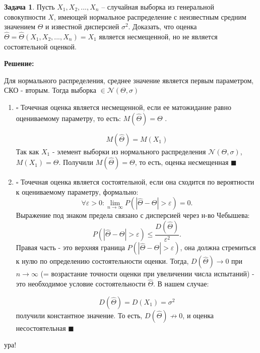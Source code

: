 \documentclass[a4paper,11pt]{article}
\theoremstyle{definition}
\newtheorem{problem}{Задача}\setlength{\parindent}{0pt}
\newenvironment{solution}
{\begin{shaded}\textbf{Решение:}\par\setlength{\parindent}{0pt}}
{\end{shaded}}
\newenvironment{answer}
{\par\noindent\textbf{Ответ:}}
{\par}
\begin{document}
\vspace{8pt}
\begin{problem}
    Пусть \(X_1,X_2, ... ,X_n\) – случайная выборка из генеральной совокупности \(X\), 
    имеющей нормальное распределение с неизвестным средним значением \( \Theta \) 
    и известной дисперсией \( \sigma ^ 2\). Доказать, что оценка 
    \( \hat\Theta = \hat\Theta (X_1,X_2, ... ,X_n) = X_1 \) является несмещенной, 
    но не является состоятельной оценкой.

    \begin{solution}
        Для нормального распределения, среднее значение является первым параметром, СКО - вторым. 
        Тогда выборка \(\in \mathcal{N}(\Theta, \sigma)\)
        \begin{enumerate}
            \item \(\square\) Точечная оценка является несмещенной, если ее матожидание 
                  равно оцениваемому параметру, то есть: \(M(\hat{\Theta}) = \Theta\) .

                  \[ M(\hat{\Theta}) = M(X_1)\]
                  Так как \(X_1\) - элемент выборки из нормального распределения \(\mathcal{N}(\Theta, \sigma)\),
                  \(M(X_1) = \Theta\). Получили \(M(\hat{\Theta}) = \Theta\), то есть, оценка несмещенная \(\blacksquare\)

            \item \(\square\) Точечная оценка является состоятельной, если она сходится по вероятности 
                  к оцениваемому параметру, формально:
                  \[\forall\varepsilon > 0 : \lim_{n\to\infty}P(|\hat{\Theta} - \Theta| > \varepsilon) = 0.\]
                  Выражение под знаком предела связано с дисперсией через н-во Чебышева: 
                  \[ P(|\hat{\Theta} - \Theta| > \varepsilon) \leq \frac{D(\hat{\Theta})}{\varepsilon^2}.\]
                  Правая часть - это верхняя граница \( P(|\hat{\Theta} - \Theta| > \varepsilon) \), она должна стремиться 
                  к нулю по определению состоятельности оценки. 
                  Тогда, \(D(\hat{\Theta})\to0\) при \(n\to\infty\) (= возрастание точности оценки при увеличении числа испытаний) 
                  - это необходимое условие состоятельности \(\hat{\Theta}\). В нашем случае:

                  \[D(\hat{\Theta}) = D(X_1) = \sigma^2\]
                  получили константное значение. То есть, \(D(\hat{\Theta}) \nrightarrow 0\), и оценка несостоятельная \(\blacksquare\)

        \end{enumerate}
    \end{solution}


\end{problem}

\vspace{25pt}
ура!
\end{document}
